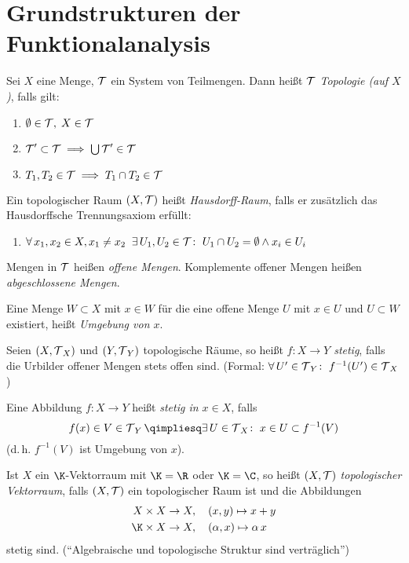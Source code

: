 \chapter{Grundstrukturen der Funktionalanalysis}
\begin{thEmpty}[Topologie]
    Sei $X$ eine Menge, $\operatorname{\mathcal{T}}$ ein System von Teilmengen. Dann heißt $\operatorname{\mathcal{T}}$
    \emph{Topologie (auf $X$)}, falls gilt:
    \begin{enumerate}[({T}1),labelsep=1em,leftmargin=2cm]
        \item
            \quad $\emptyset\in\operatorname{\mathcal{T}},\;X\in\operatorname{\mathcal{T}}$
        \item
            \quad $\operatorname{\mathcal{T}}'\subset\operatorname{\mathcal{T}} \implies \bigcup \operatorname{\mathcal{T}}' \in \operatorname{\mathcal{T}}$
        \item
            \quad $T_1,T_2\in\operatorname{\mathcal{T}} \implies T_1\cap T_2\in\operatorname{\mathcal{T}}$
    \end{enumerate}

    Ein topologischer Raum $(X,\operatorname{\mathcal{T}})$ heißt \emph{Hausdorff-Raum}, falls er
    zusätzlich das Hausdorffsche Trennungsaxiom erfüllt:
    \begin{enumerate}[({T}4),labelsep=1em,leftmargin=2cm]
        \item
            \quad $\forall\, x_1,x_2\in X, x_1\neq x_2\;\; \exists\,
            U_1,U_2\in\operatorname{\mathcal{T}}\colon\; U_1\cap U_2=\emptyset \wedge x_i\in U_i$
    \end{enumerate}

    Mengen in $\operatorname{\mathcal{T}}$ heißen \emph{offene Mengen}. Komplemente offener Mengen heißen
    \emph{abgeschlossene Mengen}.

    Eine Menge $W\subset X$ mit $x\in W$ für die eine offene Menge $U$ mit $x\in U$
    und $U\subset W$ existiert, heißt \emph{Umgebung von $x$}.

    Seien $(X,\operatorname{\mathcal{T}}_X)$ und $(Y,\operatorname{\mathcal{T}}_Y)$ topologische Räume, so heißt 
    \emph{$f\colon X\to Y$ stetig}, falls die Urbilder offener Mengen stets offen sind.
    (Formal: $\forall\,U'\in\operatorname{\mathcal{T}}_Y\colon\; f^{-1}(U')\in\operatorname{\mathcal{T}}_X$)

    Eine Abbildung $f\colon X\to Y$ heißt \emph{stetig in $x\in X$}, falls
    \[ f(x)\in V\in\Topo_Y \qimpliesq \exists\,U\in\Topo_X\colon\; x\in U\subset
        f^{-1}(V)
    \]
    (d.\,h. $f^{-1}(V)$ ist Umgebung von $x$).
\end{thEmpty}

\begin{thEmpty}
    Ist $X$ ein $\K$-Vektorraum mit $\K=\R$ oder $\K=\C$, so heißt $(X,\operatorname{\mathcal{T}})$
    \emph{topologischer Vektorraum}, falls $(X,\operatorname{\mathcal{T}})$ ein topologischer Raum
    ist und die Abbildungen
    \begin{align*}
        X\times X  &\to X, \quad (x,y)\mapsto x+y \\
        \K\times X &\to X, \quad (\alpha,x)\mapsto \alpha \, x
    \end{align*}
    stetig sind. (\enquote{Algebraische und topologische Struktur sind
    verträglich})
\end{thEmpty}

